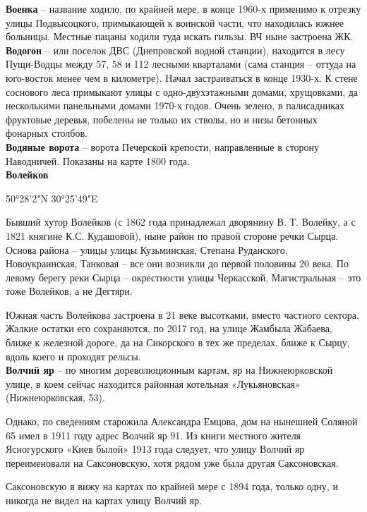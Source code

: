 \textbf{Военка} – название ходило, по крайней мере, в конце 1960-х применимо к отрезку улицы Подвысоцкого, примыкающей к воинской части, что находилась южнее больницы. Местные пацаны ходили туда искать гильзы. ВЧ ныне застроена ЖК.\\ 

\textbf{Водогон} – или поселок ДВС (Днепровской водной станции), находится в лесу Пущи-Вод\-цы между 57, 58 и 112 лесными кварталами (сама станция – оттуда на юго-восток менее чем в километре). Начал застраиваться в конце 1930-х. К стене соснового леса примыкают улицы с одно-двухэтажными домами, хрущовками, да несколькими панельными домами 1970-х годов. Очень зелено, в палисадниках фруктовые деревья, побелены не только их стволы, но и низы бетонных фонарных столбов.\\

\textbf{Водяные ворота} – ворота Печерской крепости, направленные в сторону Наводничей. Показаны на карте 1800 года.\\

\textbf{Волейков}

50°28'2"N 30°25'49"E

Бывший хутор Волейков (с 1862 года принадлежал дворянину В. Т. Волейку, а с 1821 княгине К.С. Кудашовой), ныне район по правой стороне речки Сырца. Основа района – улицы улицы Кузьминская, Степана Руданского, Новоукраинская, Танковая – все они возникли до первой половины 20 века. По левому берегу реки Сырца – окрестности улицы Черкасской, Магистральная – это тоже Волейков, а не Дегтяри.

Южная часть Волейкова застроена в 21 веке высотками, вместо частного сектора. Жалкие остатки его сохраняются, по 2017 год, на улице Жамбыла Жабаева, ближе к железной дороге, да на Сикорского в тех же пределах, ближе к Сырцу, вдоль коего и проходят рельсы.\\

\textbf{Волчий яр} – по многим  дореволюционным картам, яр на Нижнеюрковской улице, в коем сейчас находится районная котельная «Лукьяновская» (Нижнеюрковская, 53). 

Однако, по сведениям старожила Александ\-ра Емцова, дом на нынешней Соляной 65 имел в 1911 году адрес Волчий яр 91. Из книги местного жителя Ясногурского «Киев былой» 1913 года следует, что улицу Волчий яр переименовали на Саксоновскую, хотя рядом уже была другая Саксоновская.

Саксоновскую я вижу на картах по крайней мере с 1894 года, только одну, и никогда не видел на картах улицу Волчий яр. 

